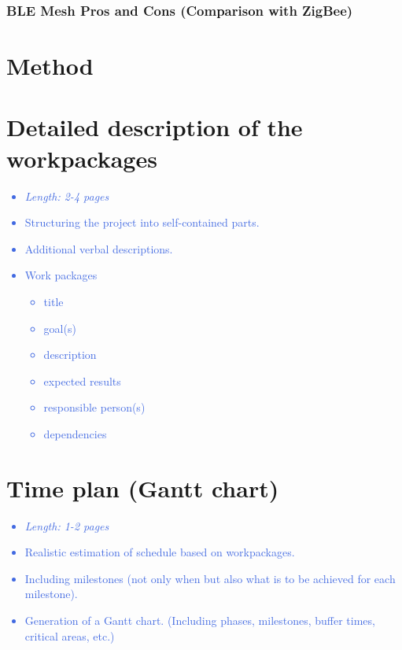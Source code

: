 \documentclass[a4paper,11pt]{article}
\providecommand*{\note}[1]{\small \textcolor{RoyalBlue}{\begin{minipage}{\textwidth}{#1}\end{minipage}}}
\begin{document}
\subsubsection{BLE Mesh Pros and Cons (Comparison with ZigBee)}
\section{Method}
\label{sect:method}

\section{Detailed description of the workpackages}
\label{sect:workplan}

\note{
\begin{itemize}
\item {\em Length: 2-4 pages}
\item Structuring the project into self-contained parts.
\item Additional verbal descriptions.
\item Work packages
    \begin{itemize}
    \item title
    \item goal(s)
    \item description
    \item expected results
    \item responsible person(s)
    \item dependencies
    \end{itemize}
\end{itemize}
}

\section{Time plan (Gantt chart)}
\label{sect:timeplan}

\note{
\begin{itemize}
\item {\em Length: 1-2 pages}
\item Realistic estimation of schedule based on workpackages.
\item Including milestones (not only when but also what is to be achieved for each milestone).
\item Generation of a Gantt chart. (Including phases, milestones, buffer times, critical areas, etc.)
\end{itemize}
}
\end{document}
